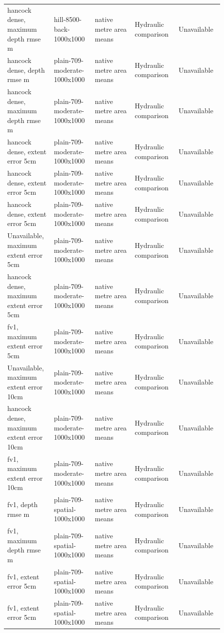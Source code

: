 \begin{longtable}{p{0.1760\linewidth}p{0.1760\linewidth}p{0.1760\linewidth}p{0.1760\linewidth}p{0.1760\linewidth}}
hancock dense, maximum depth rmse m & hill-8500-back-1000x1000 & native metre area means & Hydraulic comparison & Unavailable \\
hancock dense, depth rmse m & plain-709-moderate-1000x1000 & native metre area means & Hydraulic comparison & Unavailable \\
hancock dense, maximum depth rmse m & plain-709-moderate-1000x1000 & native metre area means & Hydraulic comparison & Unavailable \\
hancock dense, extent error 5cm & plain-709-moderate-1000x1000 & native metre area means & Hydraulic comparison & Unavailable \\
hancock dense, extent error 5cm & plain-709-moderate-1000x1000 & native metre area means & Hydraulic comparison & Unavailable \\
hancock dense, extent error 5cm & plain-709-moderate-1000x1000 & native metre area means & Hydraulic comparison & Unavailable \\
Unavailable, maximum extent error 5cm & plain-709-moderate-1000x1000 & native metre area means & Hydraulic comparison & Unavailable \\
hancock dense, maximum extent error 5cm & plain-709-moderate-1000x1000 & native metre area means & Hydraulic comparison & Unavailable \\
fv1, maximum extent error 5cm & plain-709-moderate-1000x1000 & native metre area means & Hydraulic comparison & Unavailable \\
Unavailable, maximum extent error 10cm & plain-709-moderate-1000x1000 & native metre area means & Hydraulic comparison & Unavailable \\
hancock dense, maximum extent error 10cm & plain-709-moderate-1000x1000 & native metre area means & Hydraulic comparison & Unavailable \\
fv1, maximum extent error 10cm & plain-709-moderate-1000x1000 & native metre area means & Hydraulic comparison & Unavailable \\
fv1, depth rmse m & plain-709-spatial-1000x1000 & native metre area means & Hydraulic comparison & Unavailable \\
fv1, maximum depth rmse m & plain-709-spatial-1000x1000 & native metre area means & Hydraulic comparison & Unavailable \\
fv1, extent error 5cm & plain-709-spatial-1000x1000 & native metre area means & Hydraulic comparison & Unavailable \\
fv1, extent error 5cm & plain-709-spatial-1000x1000 & native metre area means & Hydraulic comparison & Unavailable \\

\end{longtable}

